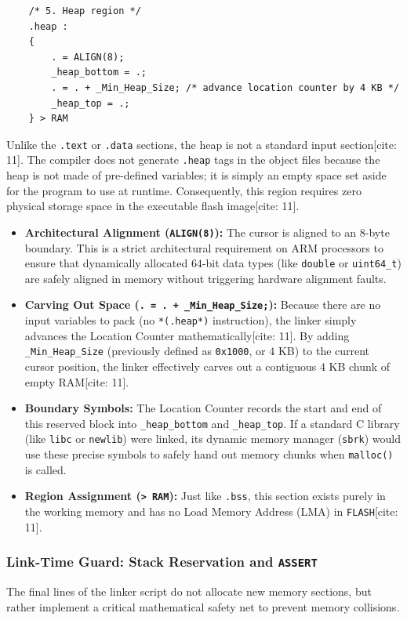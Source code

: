 \begin{lstlisting}
    /* 5. Heap region */
    .heap :
    {
        . = ALIGN(8);
        _heap_bottom = .;
        . = . + _Min_Heap_Size; /* advance location counter by 4 KB */
        _heap_top = .;
    } > RAM
\end{lstlisting}

Unlike the \texttt{.text} or \texttt{.data} sections, the heap is not a standard input section[cite: 11]. The compiler does not generate \texttt{.heap} tags in the object files because the heap is not made of pre-defined variables; it is simply an empty space set aside for the program to use at runtime. Consequently, this region requires zero physical storage space in the executable flash image[cite: 11].

\begin{itemize}
    \item \textbf{Architectural Alignment (\texttt{ALIGN(8)}):} The cursor is aligned to an $8$-byte boundary. This is a strict architectural requirement on ARM processors to ensure that dynamically allocated $64$-bit data types (like \texttt{double} or \texttt{uint64\_t}) are safely aligned in memory without triggering hardware alignment faults.
    \item \textbf{Carving Out Space (\texttt{. = . + \_Min\_Heap\_Size;}):} Because there are no input variables to pack (no \texttt{*(.heap*)} instruction), the linker simply advances the Location Counter mathematically[cite: 11]. By adding \texttt{\_Min\_Heap\_Size} (previously defined as \texttt{0x1000}, or $4$ KB) to the current cursor position, the linker effectively carves out a contiguous $4$ KB chunk of empty RAM[cite: 11].
    \item \textbf{Boundary Symbols:} The Location Counter records the start and end of this reserved block into \texttt{\_heap\_bottom} and \texttt{\_heap\_top}. If a standard C library (like \texttt{libc} or \texttt{newlib}) were linked, its dynamic memory manager (\texttt{sbrk}) would use these precise symbols to safely hand out memory chunks when \texttt{malloc()} is called.
    \item \textbf{Region Assignment (\texttt{> RAM}):} Just like \texttt{.bss}, this section exists purely in the working memory and has no Load Memory Address (LMA) in \texttt{FLASH}[cite: 11].
\end{itemize}

\subsubsection{Link-Time Guard: Stack Reservation and \texttt{ASSERT}}
The final lines of the linker script do not allocate new memory sections, but rather implement a critical mathematical safety net to prevent memory collisions.

